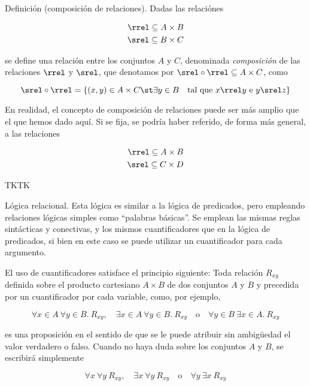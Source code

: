 Definición (composición de relaciones). Dadas las relaciónes

\begin{align*}
  \rrel \subseteq A \times B \\
  \srel \subseteq B \times C \\
\end{align*}

\noindent se define una relación entre los conjuntos $A$ y $C$, denominada
\emph{composición} de las relaciones $\rrel$ y $\srel$, que denotamos por
$\srel \circ \rrel \subseteq A \times C$, como

$$ \srel \circ \rrel = \{(x, y) \in A \times C \st \exists y \in B \quad
\text{tal que} \ x \rrel y \ \text{e} \ y \srel z\} $$

En realidad, el concepto de composición de relaciones puede ser más amplio
que el que hemos dado aquí. Si se fija, se podría haber referido, de forma
más general, a las relaciones

\begin{align*}
  \rrel \subseteq A \times B \\
  \srel \subseteq C \times D \\
\end{align*}

TKTK

Lógica relacional. Esta lógica es similar a la lógica de predicados, pero
empleando relaciones lógicas simples como ``palabras básicas''. Se emplean
las mismas reglas sintácticas y conectivas, y los mismos cuantificadores que
en la lógica de predicados, si bien en este caso se puede utilizar un
cuantificador para cada argumento.

El uso de cuantificadores satisface el principio siguiente: Toda relación
$R_{xy}$ definida sobre el producto cartesiano $A \times B$ de dos conjuntos
$A$ y $B$ y precedida por un cuantificador por cada variable, como, por
ejemplo,

\[ \forall x \in A \ \forall y \in B. \ R_{xy}, \quad \exists x \in A \
\forall y \in B. \ R_{xy} \quad \text{o} \quad \forall y \in B \ \exists x
\in A. \ R_{xy} \]

\noindent es una proposición en el sentido de que se le puede atribuir sin
ambigüedad el valor verdadero o falso. Cuando no haya duda sobre los
conjuntos $A$ y $B$, se escribirá simplemente

\[ \forall x \ \forall y \ R_{xy}, \quad \exists x \ \forall y \ R_{xy}
\quad \text{o} \quad \forall y \ \exists x \ R_{xy} \]

